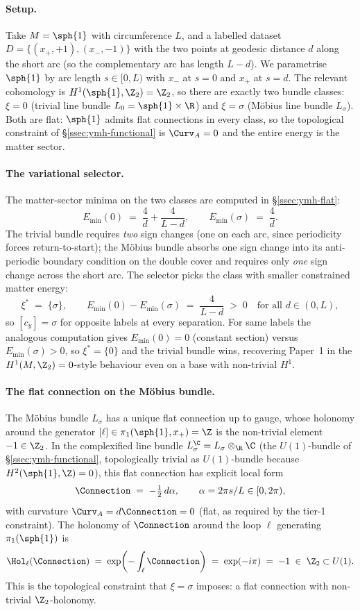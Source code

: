 \paragraph{Setup.} Take $M=\sph{1}$ with circumference $L$, and a
labelled dataset $D=\{(x_+,+1),(x_-,-1)\}$ with the two points at
geodesic distance $d$ along the short arc (so the complementary arc
has length $L-d$). We parametrise $\sph{1}$ by arc length $s\in[0,L)$
with $x_-$ at $s=0$ and $x_+$ at $s=d$. The relevant cohomology is
$H^1(\sph{1},\Z_2)=\Z_2$, so there are exactly two bundle classes:
$\xi=0$ (trivial line bundle $L_0=\sph{1}\times\R$) and $\xi=\sigma$
(M\"obius line bundle $L_\sigma$). Both are flat: $\sph{1}$ admits
flat connections in every class, so the topological constraint of
\S\ref{ssec:ymh-functional} is $\Curv_A=0$ and the entire energy
is the matter sector.

\paragraph{The variational selector.} The matter-sector minima on
the two classes are computed in \S\ref{ssec:ymh-flat}:
\[
   E_{\min}(0) \;=\; \frac{4}{d}+\frac{4}{L-d},
   \qquad
   E_{\min}(\sigma) \;=\; \frac{4}{d}.
\]
The trivial bundle requires \emph{two} sign changes (one on each
arc, since periodicity forces return-to-start); the M\"obius bundle
absorbs one sign change into its anti-periodic boundary condition
on the double cover and requires only \emph{one} sign change across
the short arc. The selector picks the class with smaller constrained
matter energy:
\[
   \xi^* \;=\; \{\sigma\},
   \qquad
   E_{\min}(0) - E_{\min}(\sigma) \;=\; \frac{4}{L-d} \;>\; 0
   \quad\text{for all } d\in(0,L),
\]
so $[c_y]=\sigma$ for opposite labels at every separation. For same
labels the analogous computation gives $E_{\min}(0)=0$
(constant section) versus $E_{\min}(\sigma)>0$, so $\xi^*=\{0\}$
and the trivial bundle wins, recovering Paper~1 in the
$H^1(M,\Z_2)=0$-style behaviour even on a base with non-trivial
$H^1$.

\paragraph{The flat connection on the M\"obius bundle.} The
M\"obius bundle $L_\sigma$ has a unique flat connection up to gauge,
whose holonomy around the generator $[\ell]\in\pi_1(\sph{1},x_+)=\Z$
is the non-trivial element $-1\in\Z_2$. In the complexified line
bundle $L_\sigma^\C=L_\sigma\otimes_\R\C$ (the $U(1)$-bundle of
\S\ref{ssec:ymh-functional}, topologically trivial as $U(1)$-bundle
because $H^2(\sph{1},\Z)=0$), this flat connection has explicit
local form
\[
   \Connection \;=\; -\tfrac{1}{2}\,d\alpha,
   \qquad \alpha=2\pi s/L\in[0,2\pi),
\]
with curvature $\Curv_A=d\Connection=0$ (flat, as required by the
tier-1 constraint). The holonomy of $\Connection$ around the loop
$\ell$ generating $\pi_1(\sph{1})$ is
\[
   \Hol_\ell(\Connection) \;=\; \exp\!\left(-\int_\ell \Connection\right)
   \;=\; \exp(-i\pi) \;=\; -1 \;\in\;\Z_2\subset U(1).
\]
This is the topological constraint that $\xi=\sigma$ imposes: a
flat connection with non-trivial $\Z_2$-holonomy.

